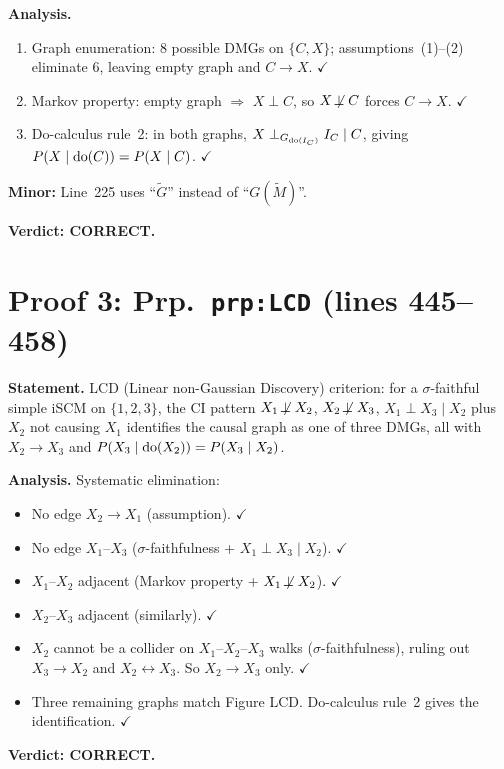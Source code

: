 \documentclass{article}
\begin{document}
\textbf{Analysis.}
\begin{enumerate}[leftmargin=*]
  \item Graph enumeration: 8 possible DMGs on $\{C,X\}$; assumptions~(1)--(2)
    eliminate 6, leaving empty graph and $C\to X$.  $\checkmark$
  \item Markov property: empty graph $\Rightarrow$ $X\perp C$, so
    $X\not\!\perp C$ forces $C\to X$.  $\checkmark$
  \item Do-calculus rule~2: in both graphs, $X\perp_{G_{\operatorname{do}(I_C)}} I_C\mid C$,
    giving $P(X\mid\operatorname{do}(C))=P(X\mid C)$.  $\checkmark$
\end{enumerate}

\textbf{Minor:} Line~225 uses ``$\tilde G$'' instead of ``$G(\tilde M)$''.

\textbf{Verdict: CORRECT.}

\section{Proof 3: Prp.\ \texttt{prp:LCD} (lines 445--458)}

\textbf{Statement.} LCD (Linear non-Gaussian Discovery) criterion: for a
$\sigma$-faithful simple iSCM on $\{1,2,3\}$, the CI pattern
$X_1\not\!\perp X_2$, $X_2\not\!\perp X_3$, $X_1\perp X_3\mid X_2$
plus $X_2$ not causing $X_1$ identifies the causal graph as one of three DMGs,
all with $X_2\to X_3$ and $P(X_3\mid\operatorname{do}(X_2))=P(X_3\mid X_2)$.

\textbf{Analysis.}
Systematic elimination:
\begin{itemize}
  \item No edge $X_2\to X_1$ (assumption).  $\checkmark$
  \item No edge $X_1$--$X_3$ ($\sigma$-faithfulness + $X_1\perp X_3\mid X_2$).
    $\checkmark$
  \item $X_1$--$X_2$ adjacent (Markov property + $X_1\not\!\perp X_2$).  $\checkmark$
  \item $X_2$--$X_3$ adjacent (similarly).  $\checkmark$
  \item $X_2$ cannot be a collider on $X_1$--$X_2$--$X_3$ walks
    ($\sigma$-faithfulness), ruling out $X_3\to X_2$ and
    $X_2\leftrightarrow X_3$.  So $X_2\to X_3$ only.  $\checkmark$
  \item Three remaining graphs match Figure LCD.  Do-calculus rule~2 gives
    the identification.  $\checkmark$
\end{itemize}

\textbf{Verdict: CORRECT.}
\end{document}
